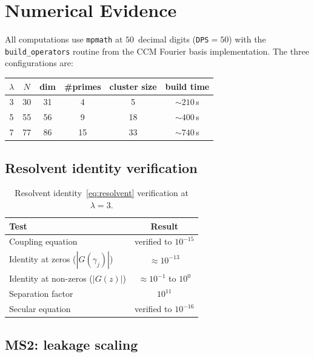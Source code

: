 \documentclass[12pt,a4paper]{article}
\theoremstyle{definition}
\theoremstyle{remark}
\begin{document}
\section{Numerical Evidence}
\label{sec:numerics}

All computations use \texttt{mpmath} at $50$~decimal digits
(\texttt{DPS}$=50$) with the \texttt{build\_operators} routine
from the CCM Fourier basis implementation.
The three configurations are:

\begin{center}
\begin{tabular}{cccccc}
\toprule
$\lambda$ & $N$ & dim & \#primes & cluster size & build time \\
\midrule
3 & 30 & 31 & 4 & 5 & $\sim 210$\,s \\
5 & 55 & 56 & 9 & 18 & $\sim 400$\,s \\
7 & 77 & 86 & 15 & 33 & $\sim 740$\,s \\
\bottomrule
\end{tabular}
\end{center}

\subsection{Resolvent identity verification}

\begin{table}[h]
\centering
\caption{Resolvent identity~\eqref{eq:resolvent} verification at $\lambda = 3$.}
\label{tab:resolvent}
\begin{tabular}{lc}
\toprule
Test & Result \\
\midrule
Coupling equation & verified to $10^{-15}$ \\
Identity at zeros ($|G(\gamma_j)|$) & $\approx 10^{-13}$ \\
Identity at non-zeros ($|G(z)|$) & $\approx 10^{-1}$ to $10^{0}$ \\
Separation factor & $10^{11}$ \\
Secular equation & verified to $10^{-16}$ \\
\bottomrule
\end{tabular}
\end{table}

\subsection{MS2: leakage scaling}
\end{document}
